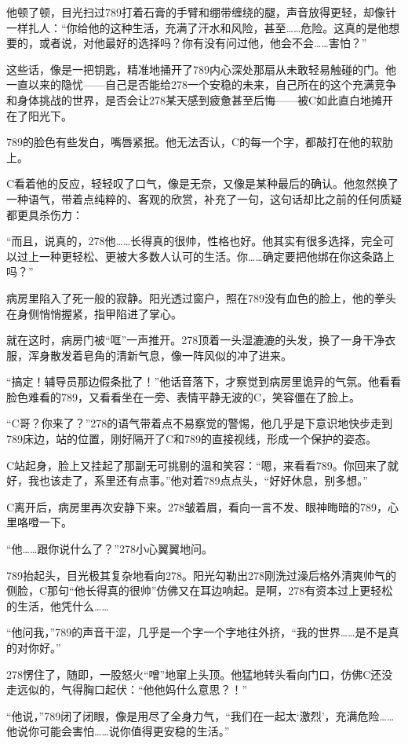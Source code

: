 \documentclass[a4paper]{book}
\begin{document}
他顿了顿，目光扫过789打着石膏的手臂和绷带缠绕的腿，声音放得更轻，却像针一样扎人：“你给他的这种生活，充满了汗水和风险，甚至……危险。这真的是他想要的，或者说，对他最好的选择吗？你有没有问过他，他会不会……害怕？”

这些话，像是一把钥匙，精准地捅开了789内心深处那扇从未敢轻易触碰的门。他一直以来的隐忧——自己是否能给278一个安稳的未来，自己所在的这个充满竞争和身体挑战的世界，是否会让278某天感到疲惫甚至后悔——被C如此直白地摊开在了阳光下。

789的脸色有些发白，嘴唇紧抿。他无法否认，C的每一个字，都敲打在他的软肋上。

C看着他的反应，轻轻叹了口气，像是无奈，又像是某种最后的确认。他忽然换了一种语气，带着点纯粹的、客观的欣赏，补充了一句，这句话却比之前的任何质疑都更具杀伤力：

“而且，说真的，278他……长得真的很帅，性格也好。他其实有很多选择，完全可以过上一种更轻松、更被大多数人认可的生活。你……确定要把他绑在你这条路上吗？”

病房里陷入了死一般的寂静。阳光透过窗户，照在789没有血色的脸上，他的拳头在身侧悄悄握紧，指甲陷进了掌心。

就在这时，病房门被“哐”一声推开。278顶着一头湿漉漉的头发，换了一身干净衣服，浑身散发着皂角的清新气息，像一阵风似的冲了进来。

“搞定！辅导员那边假条批了！”他话音落下，才察觉到病房里诡异的气氛。他看看脸色难看的789，又看看坐在一旁、表情平静无波的C，笑容僵在了脸上。

“C哥？你来了？”278的语气带着点不易察觉的警惕，他几乎是下意识地快步走到789床边，站的位置，刚好隔开了C和789的直接视线，形成一个保护的姿态。

C站起身，脸上又挂起了那副无可挑剔的温和笑容：“嗯，来看看789。你回来了就好，我也该走了，系里还有点事。”他对着789点点头，“好好休息，别多想。”

C离开后，病房里再次安静下来。278皱着眉，看向一言不发、眼神晦暗的789，心里咯噔一下。

“他……跟你说什么了？”278小心翼翼地问。

789抬起头，目光极其复杂地看向278。阳光勾勒出278刚洗过澡后格外清爽帅气的侧脸，C那句“他长得真的很帅”仿佛又在耳边响起。是啊，278有资本过上更轻松的生活，他凭什么……

“他问我，”789的声音干涩，几乎是一个字一个字地往外挤，“我的世界……是不是真的对你好。”

278愣住了，随即，一股怒火“噌”地窜上头顶。他猛地转头看向门口，仿佛C还没走远似的，气得胸口起伏：“他他妈什么意思？！”

“他说，”789闭了闭眼，像是用尽了全身力气，“我们在一起太‘激烈’，充满危险……他说你可能会害怕……说你值得更安稳的生活。”
\end{document}
